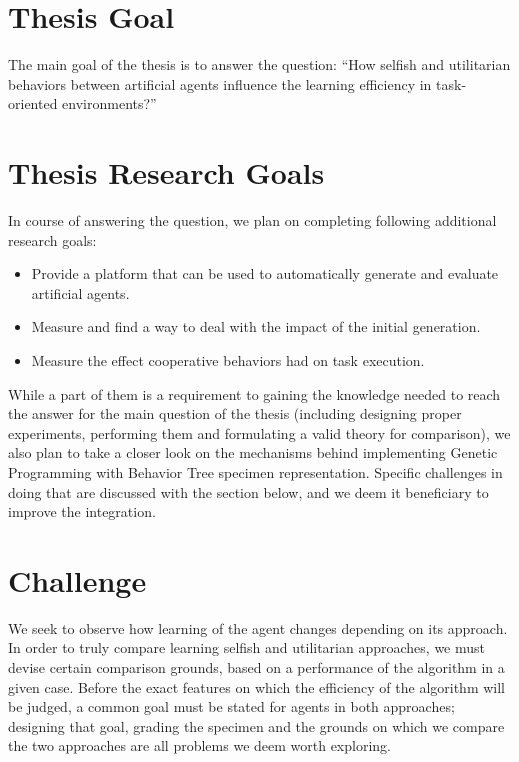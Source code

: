 \section{Thesis Goal}
The main goal of the thesis is to answer the question:
``How selfish and utilitarian behaviors between artificial agents influence the learning efficiency in task-oriented environments?'' %

\section{Thesis Research Goals}
In course of answering the question, we plan on completing following additional research goals:

\begin{itemize}
    \item Provide a platform that can be used to automatically generate and evaluate artificial agents.
    \item Measure and find a way to deal with the impact of the initial generation.
    \item Measure the effect cooperative behaviors had on task execution.
\end{itemize}

While a part of them is a requirement to gaining the knowledge needed to reach the answer for the main question of the thesis (including designing proper experiments, performing them and formulating a valid theory for comparison), we also plan to take a closer look on the mechanisms behind implementing Genetic Programming with Behavior Tree specimen representation. Specific challenges in doing that are discussed with the section below, and we deem it beneficiary to improve the integration.

\section{Challenge}
We seek to observe how learning of the agent changes depending on its approach. In order to truly compare learning selfish and utilitarian approaches, we must devise certain comparison grounds, based on a performance of the algorithm in a given case. Before the exact features on which the efficiency of the algorithm will be judged, a common goal must be stated for agents in both approaches; designing that goal, grading the specimen and the grounds on which we compare the two approaches are all problems we deem worth exploring.

